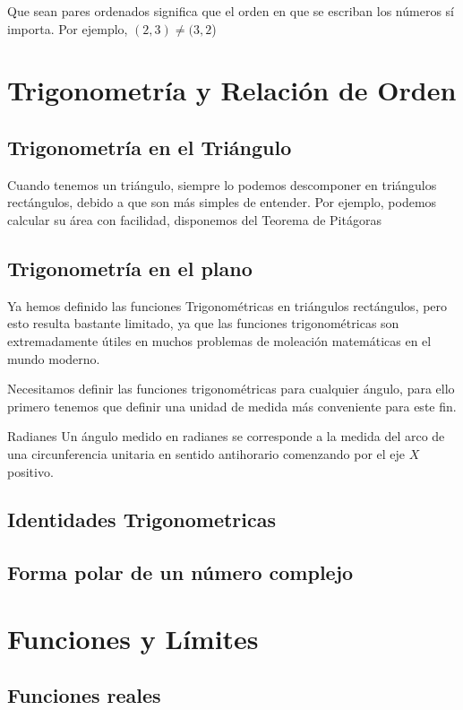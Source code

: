 \documentclass[11pt, twoside]{memoir}
\begin{document}
\begin{note}
    Que sean pares ordenados significa que el orden en que se escriban los números sí importa. Por ejemplo,
    \((2,3)\neq (3,2\))
\end{note}


\chapter{Trigonometría y Relación de Orden}
\section{Trigonometría en el Triángulo}
Cuando tenemos un triángulo, siempre lo podemos descomponer en triángulos rectángulos, debido a que son más simples de entender.
Por ejemplo, podemos calcular su área con facilidad, disponemos del Teorema de Pitágoras

\section{Trigonometría en el plano}
Ya hemos definido las funciones Trigonométricas en triángulos rectángulos, pero esto resulta bastante limitado, ya que las funciones trigonométricas son extremadamente útiles en muchos problemas de moleación matemáticas en el mundo moderno.


Necesitamos definir las funciones trigonométricas para cualquier ángulo, para ello primero tenemos que definir una unidad de medida más conveniente para este fin.
\begin{definition}{Radianes}
    Un ángulo medido en radianes se corresponde a la medida del arco de una circunferencia unitaria en sentido antihorario comenzando por el eje \(X\) positivo.
\end{definition}
\section{Identidades Trigonometricas}

\section{Forma polar de un número complejo}



\chapter{Funciones y Límites}
\section{Funciones reales}
\end{document}
